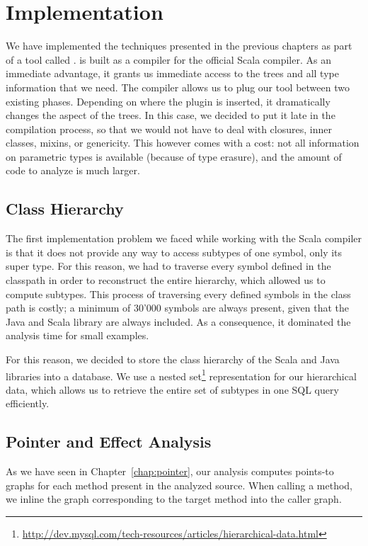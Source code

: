 \chapter{Implementation}
\label{chap:implementation}
We have implemented the techniques presented in the previous chapters as part
of a tool called {\insane}. {\insane} is built as a compiler for the official
Scala compiler. As an immediate advantage, it grants us immediate access to the
trees and all type information that we need. The compiler allows us to plug our
tool between two existing phases. Depending on where the plugin is inserted, it
dramatically changes the aspect of the trees. In this case, we decided to put
it late in the compilation process, so that we would not have to deal with
closures, inner classes, mixins, or genericity. This however comes with a cost:
not all information on parametric types is available (because of type erasure),
and the amount of code to analyze is much larger.

\section{Class Hierarchy}
The first implementation problem we faced while working with the Scala compiler
is that it does not provide any way to access subtypes of one symbol, only its
super type. For this reason, we had to traverse every symbol defined in the
classpath in order to reconstruct the entire hierarchy, which allowed us to
compute subtypes. This process of traversing every defined symbols in the class
path is costly; a minimum of 30'000 symbols are always present, given that the
Java and Scala library are always included. As a consequence, it dominated the
analysis time for small examples.

For this reason, we decided to store the class hierarchy of the Scala and Java
libraries into a database. We use a nested
set\footnote{\url{http://dev.mysql.com/tech-resources/articles/hierarchical-data.html}}
representation for our hierarchical data, which allows us to retrieve the entire
set of subtypes in one SQL query efficiently.

\section{Pointer and Effect Analysis}
As we have seen in Chapter~\ref{chap:pointer}, our analysis computes points-to
graphs for each method present in the analyzed source. When calling a method,
we inline the graph corresponding to the target method into the caller graph.

